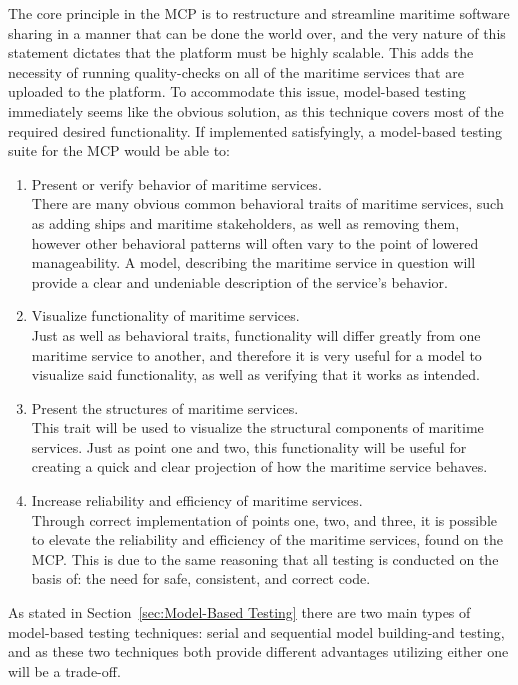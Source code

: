 The core principle in the MCP is to restructure and streamline maritime software sharing in a manner that can be done the world over, and the very nature of this statement dictates that the platform must be highly scalable. This adds the necessity of running quality-checks on all of the maritime services that are uploaded to the platform. To accommodate this issue, model-based testing immediately seems like the obvious solution, as this technique covers most of the required desired functionality. If implemented satisfyingly, a model-based testing suite for the MCP would be able to:
\begin{enumerate}
  \item Present or verify behavior of maritime services.\\
    There are many obvious common behavioral traits of maritime services, such as adding ships and maritime stakeholders, as well as removing them, however other behavioral patterns will often vary to the point of lowered manageability. A model, describing the maritime service in question will provide a clear and undeniable description of the service's behavior.\newpage
  \item Visualize functionality of maritime services.\\
    Just as well as behavioral traits, functionality will differ greatly from one maritime service to another, and therefore it is very useful for a model to visualize said functionality, as well as verifying that it works as intended.
  \item Present the structures of maritime services.\\
    This trait will be used to visualize the structural components of maritime services. Just as point one and two, this functionality will be useful for creating a quick and clear projection of how the maritime service behaves.
  \item Increase reliability and efficiency of maritime services.\\
    Through correct implementation of points one, two, and three, it is possible to elevate the reliability and efficiency of the maritime services, found on the MCP. This is due to the same reasoning that all testing is conducted on the basis of: the need for safe, consistent, and correct code.
\end{enumerate}
\noindent
As stated in Section~\ref{sec:Model-Based Testing} there are two main types of model-based testing techniques: serial and sequential model building-and testing, and as these two techniques both provide different advantages utilizing either one will be a trade-off.\newpage

